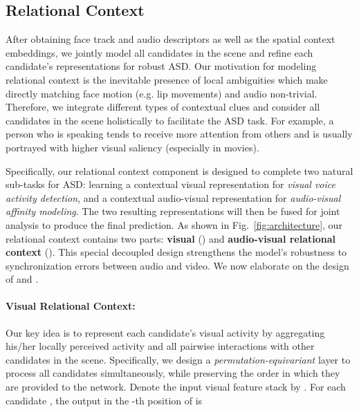 \documentclass[sigconf]{acmart}
\begin{document}
\begin{CCSXML}
 \subsection{Relational Context}\label{sec:relational-context}
After obtaining face track and audio descriptors as well as the spatial context embeddings, we jointly model all candidates in the scene and refine each candidate's representations for robust ASD. Our motivation for modeling relational context is the inevitable presence of local ambiguities which make directly matching face motion (e.g. lip movements) and audio non-trivial. Therefore, we integrate different types of contextual clues and consider all candidates in the scene holistically to facilitate the ASD task. For example, a person who is speaking tends to receive more attention from others and is usually portrayed with higher visual saliency (especially in movies).

Specifically, our relational context component is designed to complete two natural sub-tasks for ASD: learning a contextual visual representation for \textit{visual voice activity detection}, and a contextual audio-visual representation for \textit{audio-visual affinity modeling}. The two resulting representations will then be fused for joint analysis to produce the final prediction. As shown in Fig.~\ref{fig:architecture}, our relational context contains two parts: \textbf{visual} () and \textbf{audio-visual relational context} (). This special decoupled design strengthens the model's robustness to synchronization errors between audio and video. We now elaborate on the design of  and .
\paragraph{Visual Relational Context:}
\iffalse
When jointly optimizing all candidates in the scene, the order in which the candidates are arranged within the context should be immaterial. To simultaneously process all candidates, we introduce a \textit{permutation-equivariant} layer  which produces exactly one output per candidate, while preserving the order they are provided to the network. In other words, given any permutation of the  candidate speakers , where  is the symmetry group in  letters, the following holds:

\fi
Our key idea is to represent each candidate's visual activity by aggregating his/her locally perceived activity and all pairwise interactions with other candidates in the scene. Specifically, we design a \textit{permutation-equivariant} layer  to process all candidates simultaneously, while preserving the order in which they are provided to the network. Denote the input visual feature stack by . For each candidate , the output in the -th position of  is


\end{CCSXML}
\end{document}
